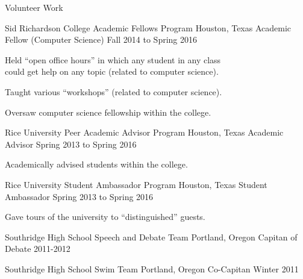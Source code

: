 \documentclass{resume}
\begin{document}
\begin{rSection}{Volunteer Work}
{    \begin{rSubSection}
    {Sid Richardson College Academic Fellows Program}
    {Houston, Texas}
    {Academic Fellow (Computer Science)}
    {Fall 2014 to Spring 2016}%
    \item Held ``open office hours'' in which any student in any class\\
    could get help on any topic (related to computer science).
    \item Taught various ``workshops'' (related to computer science).
    \item Oversaw computer science fellowship within the college.
    \end{rSubSection}

    \begin{rSubSection}
    {Rice University Peer Academic Advisor Program}
    {Houston, Texas}
    {Academic Advisor}
    {Spring 2013 to Spring 2016}%
    \item Academically advised students within the college.
    \end{rSubSection}

    \begin{rSubSection}
    {Rice University Student Ambassador Program}
    {Houston, Texas}
    {Student Ambassador}
    {Spring 2013 to Spring 2016}%
    \item Gave tours of the university to ``distinguished'' guests.
    \end{rSubSection}

    \EventWithSubtitle
    {Southridge High School Speech and Debate Team}
    {Portland, Oregon}
    {Capitan of Debate}
    {2011-2012}%

    \EventWithSubtitle
    {Southridge High School Swim Team}
    {Portland, Oregon}
    {Co-Capitan}
    {Winter 2011}%

  }{}

\end{rSection}
\end{document}
